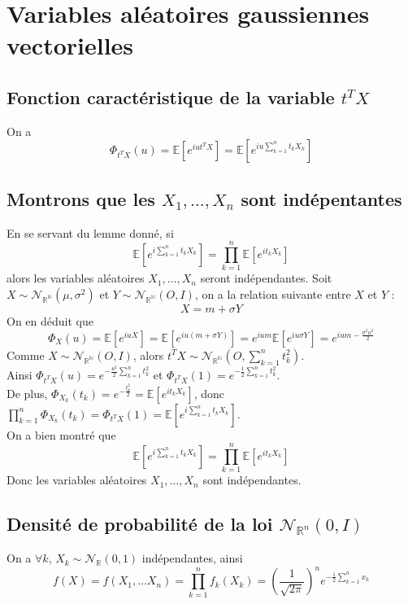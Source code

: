 \documentclass{report}
\begin{document}
	\section{Variables aléatoires gaussiennes vectorielles}
		\subsection{Fonction caractéristique de la variable $t^TX$}
			On a 
			\[\Phi_{t^TX}(u) = \mathbb{E}[e^{iut^TX}] = \mathbb{E}[e^{iu\sum\limits_{k=1}^{n}t_kX_k}] \]
		\subsection{Montrons que les $X_1, \ldots, X_n$ sont indépentantes}
			En se servant du lemme donné, si 
			\[\mathbb{E}[e^{i\sum\limits_{k=1}^{n}t_kX_k}] = \prod\limits_{k=1}^{n}\mathbb{E}[e^{it_kX_k}]\]
			alors les variables aléatoires $X_1, \ldots, X_n$ seront indépendantes.
			Soit $X \sim \mathcal{N}_{\mathbb{R}^\mathbb{N}}(\mu, \sigma^2)$ et $Y \sim \mathcal{N}_{\mathbb{R}^\mathbb{N}}(O, I)$, on a la relation suivante entre $X$ et $Y$ :
			\[ X = m + \sigma Y \]
			On en déduit que
			\[ \Phi_X(u) = \mathbb{E}[e^{iuX}] = \mathbb{E}[e^{iu(m+\sigma Y)}] = e^{ium}\mathbb{E}[e^{iu\sigma Y}] = e^{ium-\frac{\sigma^2 u^2}{2}} \]
			Comme $X \sim \mathcal{N}_{\mathbb{R}^\mathbb{N}}(O, I)$, alors $t^TX \sim \mathcal{N}_{\mathbb{R}^\mathbb{N}}(O, \sum\limits_{k=1}^{n}t_k^2)$.\\
			Ainsi $\Phi_{t^TX}(u) = e^{-\frac{u^2}{2}\sum\limits_{k=1}^{n}t_k^2}$ et $\Phi_{t^TX}(1) = e^{-\frac{1}{2}\sum\limits_{k=1}^{n}t_k^2}$.\\
			De plus, $\Phi_{X_k}(t_k) = e^{-\frac{t_k^2}{2}} = \mathbb{E}[e^{it_kX_k}] $, donc $\prod\limits_{k=1}^{n}\Phi_{X_k}(t_k) = \Phi_{t^TX}(1) = \mathbb{E}[e^{i\sum\limits_{k=1}^{n}t_kX_k}] $.\\
			On a bien montré que 
			\[\mathbb{E}[e^{i\sum\limits_{k=1}^{n}t_kX_k}] = \prod\limits_{k=1}^{n}\mathbb{E}[e^{it_kX_k}]\]
			Donc les variables aléatoires $X_1, \ldots, X_n$ sont indépendantes.
		\subsection{Densité de probabilité de la loi $\mathcal{N}_{\mathbb{R}^n}(0, I)$}
			On a $\forall k$, $X_k \sim \mathcal{N}_{\mathbb{R}}(0, 1)$ indépendantes, ainsi
			\[ f(X) = f(X_1, \ldots X_n) = \prod\limits_{k=1}^{n}f_k(X_k) = (\frac{1}{\sqrt{2\pi}})^ne^{-\frac{1}{2}\sum\limits_{k=1}^{n}x_k} \]
\end{document}
